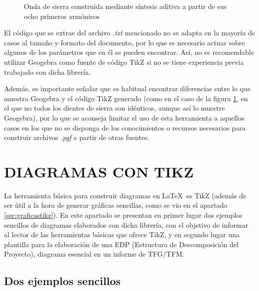 \documentclass[a4paper, 11pt, spanish, twoside]{article}
\begin{document}
\begin{figure}[H]
\caption{Onda de sierra construida mediante síntesis aditiva a partir de sus ocho primeros armónicos}
\label{fig:sawtooth}
\end{figure}

El código que se extrae del archivo \textit{.txt} mencionado no se adapta en la mayoría de casos al tamaño y formato del documento, por lo que es necesario actuar sobre algunos de los parámetros que en él se pueden encontrar. Así, no es recomendable utilizar Geogebra como fuente de código TikZ si no se tiene experiencia previa trabajado con dicha librería. 

Además, es importante señalar que es habitual encontrar diferencias entre lo que muestra Geogebra y el código TikZ generado (como en el caso de la figura \ref{fig:sawtooth}, en el que no todos los dientes de sierra son idénticos, aunque así lo muestre Geogebra), por lo que se aconseja limitar el uso de esta herramienta a aquellos casos en los que no se disponga de los conocimientos o recursos necesarios para construir archivos \textit{.pgf} a partir de otras fuentes.





\newpage
\section{DIAGRAMAS CON TIKZ} \label{sec:diagramas}

La herramienta básica para construir diagramas en \LaTeX \ es TikZ (además de ser útil a la hora de generar gráficas sencillas, como se vio en el apartado \ref{sec:graficastikz}). En este apartado se presentan en primer lugar dos ejemplos sencillos de diagramas elaborados con dicha librería, con el objetivo de informar al lector de las herramientas básicas que ofrece TikZ, y en segundo lugar una plantilla para la elaboración de una EDP (Estructura de Descomposición del Proyecto), diagrama esencial en un informe de TFG/TFM.


\subsection{Dos ejemplos sencillos}
\end{document}
